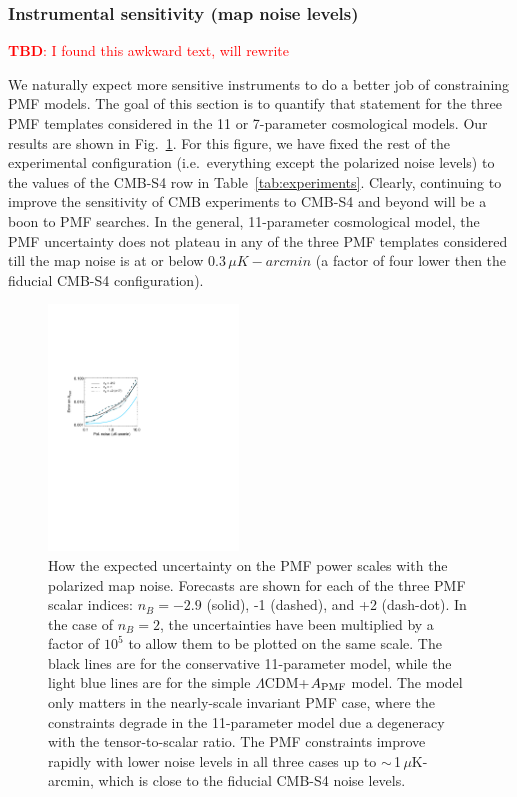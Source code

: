 \documentclass[apj]{emulateapj}
\newcommand{\apmf}{\ensuremath{A_{\rm PMF}}}
\newcommand{\lcdm}{\ensuremath{\Lambda}CDM}
\newcommand{\ukarcmin}{\ensuremath{\mu}K-arcmin}
\newcommand{\tbd}[1]{\textcolor{Red}{{\bf TBD}: #1}}
\begin{document}
\subsubsection{Instrumental sensitivity (map noise levels)}

\tbd{I found this awkward text, will rewrite}

We naturally expect more sensitive instruments to do a better job of constraining PMF models. 
The goal of this section is to quantify that statement for the three PMF templates considered in the 11 or 7-parameter cosmological models. 
Our results are shown in Fig.~\ref{fig:sensitivity}. 
For this figure, we have fixed the rest of the experimental configuration (i.e.~everything except the polarized noise levels) to the values of the CMB-S4 row in Table~\ref{tab:experiments}. 
Clearly, continuing to improve the sensitivity of CMB experiments to CMB-S4 and beyond will be a boon to PMF searches. 
In the general, 11-parameter cosmological model, the PMF uncertainty does not plateau in any of the three PMF templates considered till the map noise is at or below $0.3\,\ukarcmin$ (a factor of four lower then the fiducial CMB-S4 configuration). 


\begin{figure}[htb]\centering
\includegraphics[width=0.45\textwidth,clip,trim={2.cm 12.5cm 11cm 7.5cm}]{pmf_sens.pdf}
  \caption[]{ \label{fig:sensitivity}
  How the expected uncertainty on the PMF power scales with the polarized map noise. 
  Forecasts are shown for each of the three PMF scalar indices: $n_B = -2.9$ (solid), -1 (dashed), and +2 (dash-dot). 
  In the case of $n_B=2$, the uncertainties have been multiplied by a factor of $10^5$ to allow them to be plotted on the same scale. 
  The black lines are for the conservative 11-parameter model, while the light blue lines are for the simple \lcdm{}+\apmf{} model. 
  The model only matters in the nearly-scale invariant PMF case, where the constraints degrade in the 11-parameter model due a degeneracy with the tensor-to-scalar ratio. 
  The PMF constraints improve rapidly with lower noise levels in all three cases up to $\sim$\,1\,\ukarcmin, which is close to the  fiducial CMB-S4 noise levels. 
    }
\end{figure}
\end{document}
